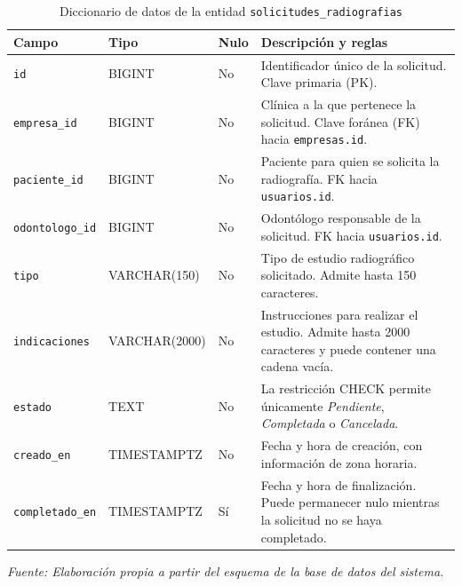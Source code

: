 \begin{table}[htbp]
  \centering
  \caption{Diccionario de datos de la entidad \texttt{solicitudes\_radiografias}}
  \label{tab:diccionario-solicitudes}
  \small
  \renewcommand{\arraystretch}{1.25}
  \setlength{\tabcolsep}{4pt}
  \begin{tabularx}{\textwidth}{
    >{\raggedright\arraybackslash}p{}
    >{\raggedright\arraybackslash}p{}
    >{\centering\arraybackslash}p{}
    >{\raggedright\arraybackslash}X}
    \toprule
    \textbf{Campo} & \textbf{Tipo} & \textbf{Nulo} & \textbf{Descripción y reglas} \\
    \midrule
    \texttt{id} & BIGINT & No & Identificador único de la solicitud. Clave primaria (PK). \\
    \texttt{empresa\_id} & BIGINT & No & Clínica a la que pertenece la solicitud. Clave foránea (FK) hacia \texttt{empresas.id}. \\
    \texttt{paciente\_id} & BIGINT & No & Paciente para quien se solicita la radiografía. FK hacia \texttt{usuarios.id}. \\
    \texttt{odontologo\_id} & BIGINT & No & Odontólogo responsable de la solicitud. FK hacia \texttt{usuarios.id}. \\
    \texttt{tipo} & VARCHAR(150) & No & Tipo de estudio radiográfico solicitado. Admite hasta 150 caracteres. \\
    \texttt{indicaciones} & VARCHAR(2000) & No & Instrucciones para realizar el estudio. Admite hasta 2000 caracteres y puede contener una cadena vacía. \\
    \texttt{estado} & TEXT & No & La restricción CHECK permite únicamente \textit{Pendiente}, \textit{Completada} o \textit{Cancelada}. \\
    \texttt{creado\_en} & TIMESTAMPTZ & No & Fecha y hora de creación, con información de zona horaria. \\
    \texttt{completado\_en} & TIMESTAMPTZ & Sí & Fecha y hora de finalización. Puede permanecer nulo mientras la solicitud no se haya completado. \\
    \bottomrule
  \end{tabularx}
  \vspace{3pt}
  {\footnotesize\textit{Fuente: Elaboración propia a partir del esquema de la base de datos del sistema.}}
\end{table}

